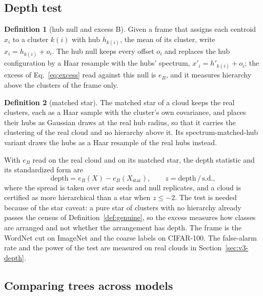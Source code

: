 \documentclass{article}
\theoremstyle{definition}
\newtheorem{definition}{Definition}
\theoremstyle{plain}
\theoremstyle{remark}
\begin{document}
\subsection{Depth test}
\label{sec:v3-depthtest}

\begin{definition}[hub null and excess B]
\label{def:hubnull}
Given a frame that assigns each centroid $x_i$ to a cluster $k(i)$ with hub $h_{k(i)}$, the mean of its cluster, write $x_i=h_{k(i)}+o_i$. The hub null keeps every offset $o_i$ and replaces the hub configuration by a Haar resample with the hubs' spectrum, $x'_i=h'_{k(i)}+o_i$; the excess of Eq.~\ref{eq:excess} read against this null is $e_B$, and it measures hierarchy above the clusters of the frame only.
\end{definition}
\begin{definition}[matched star]
\label{def:star}
The matched star of a cloud keeps the real clusters, each as a Haar sample with the cluster's own covariance, and places their hubs as Gaussian draws at the real hub radius, so that it carries the clustering of the real cloud and no hierarchy above it. Its spectrum-matched-hub variant draws the hubs as a Haar resample of the real hubs instead.
\end{definition}
With $e_B$ read on the real cloud and on its matched star, the depth statistic and its standardized form are
\begin{equation}
\mathrm{depth}=e_B(X)-e_B(X_{\mathrm{star}}),\qquad z=\mathrm{depth}\,/\,\mathrm{s.d.},
\label{eq:depth}
\end{equation}
where the spread is taken over star seeds and null replicates, and a cloud is certified as more hierarchical than a star when $z\le-2$. The test is needed because of the star caveat: a pure star of clusters with no hierarchy already passes the census of Definition~\ref{def:genuine}, so the excess measures how classes are arranged and not whether the arrangement has depth. The frame is the WordNet cut on ImageNet and the coarse labels on CIFAR-100. The false-alarm rate and the power of the test are measured on real clouds in Section~\ref{sec:v3-depth}.

\subsection{Comparing trees across models}
\label{sec:v3-treemap}
\end{document}
